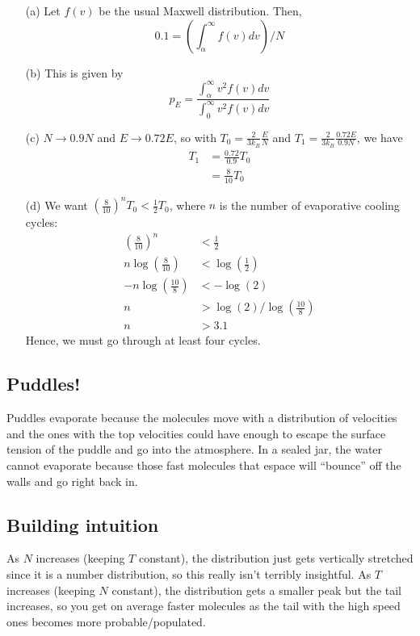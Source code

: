 \documentclass{article}
\begin{document}
\begin{itemize}
	\item[(a)] Let $f(v)$ be the usual Maxwell distribution. Then,
	\begin{equation}
	0.1 = \left(\int_{\alpha}^{\infty} f(v)dv\right)/N
	\end{equation}
	\item[(b)] This is given by
	\begin{equation}
	p_E = \frac{\int_{\alpha}^{\infty} v^2f(v)dv}{\int_0^{\infty} v^2f(v)dv}
	\end{equation}
	\item[(c)] $N\rightarrow 0.9N$ and $E\rightarrow 0.72E$, so with $T_0 = \frac{2}{3k_B}\frac{E}{N}$ and $T_1 = \frac{2}{3k_B}\frac{0.72E}{0.9N}$, we have
	\begin{align*}
	T_1 &= \frac{0.72}{0.9}T_0 \\
	&= \frac{8}{10}T_0
	\end{align*}
	\item[(d)] We want $\left(\frac{8}{10}\right)^n T_0 < \frac{1}{2}T_0$, where $n$ is the number of evaporative cooling cycles:
	\begin{align*}
	\left(\frac{8}{10}\right)^n &< \frac{1}{2} \\
	n\log\left(\frac{8}{10}\right) &< \log\left(\frac{1}{2}\right) \\
	-n\log\left(\frac{10}{8}\right) &< -\log(2) \\
	n &> \log(2)/\log\left(\frac{10}{8}\right) \\
	n &> 3.1
	\end{align*}
	Hence, we must go through at least four cycles.
\end{itemize}

\subsection{Puddles!}

Puddles evaporate because the molecules move with a distribution of velocities and the ones with the top velocities could have enough to escape the surface tension of the puddle and go into the atmosphere. In a sealed jar, the water cannot evaporate because those fast molecules that espace will ``bounce'' off the walls and go right back in.

\subsection{Building intuition}

As $N$ increases (keeping $T$ constant), the distribution just gets vertically stretched since it is a number distribution, so this really isn't terribly insightful. As $T$ increases (keeping $N$ constant), the distribution gets a smaller peak but the tail increases, so you get on average faster molecules as the tail with the high speed ones becomes more probable/populated.
\end{document}
